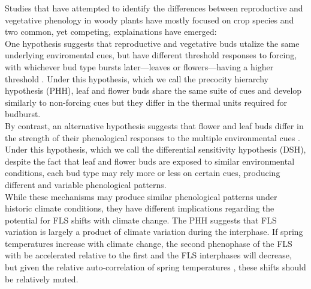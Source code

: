 \documentclass[11pt]{article}
\begin{document}
\noindent Studies that have attempted to identify the differences between reproductive and vegetative phenology in woody plants have mostly focused on crop species and two common, yet competing, explainations have emerged:\\

\noindent One hypothesis suggests that reproductive and vegetative buds utalize the same underlying enviromental cues, but have different threshold responses to forcing, with whichever bud type bursts later---leaves or flowers---having a higher threshold \citep{Guo2014,COSMULESCU:2020aa,Cosmulescu:2018aa}. Under this hypothesis, which we call the precocity hierarchy hypothesis (PHH), leaf and flower buds share the same suite of cues and develop similarly to non-forcing cues but they differ in the thermal units required for budburst.\\

\noindent By contrast, an alternative hypothesis suggests that flower and leaf buds differ in the strength of their phenological responses to the multiple environmental cues \citep{Citadin2001,Gariglio2006,Aslani2009,Mehlenbacher:1991aa}. Under this hypothesis, which we call the differential sensitivity hypothesis (DSH), despite the fact that leaf and flower buds are exposed to similar environmental conditions, each bud type may rely more or less on certain cues, producing different and variable phenological patterns.\\

\noindent While these mechanisms may produce similar phenological patterns under historic climate conditions, they have different implications regarding the potential for FLS shifts with climate change. The PHH suggests that FLS variation is largely a product of climate variation during the interphase. If spring temperatures increase with climate change, the second phenophase of the FLS with be accelerated relative to the first and the FLS interphases will decrease, but given the relative auto-correlation of spring temperatures \citep{Di-Cecco:2018aa}, these shifts should be relatively muted. \\
\end{document}
